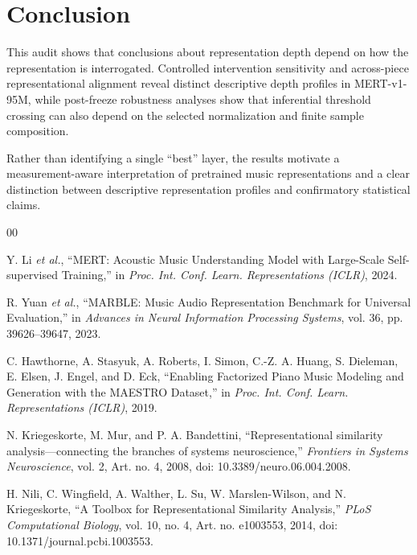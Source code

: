 \documentclass[conference]{IEEEtran}
\begin{document}
\section{Conclusion}

This audit shows that conclusions about representation depth depend on how the
representation is interrogated.
Controlled intervention sensitivity and across-piece representational
alignment reveal distinct descriptive depth profiles in MERT-v1-95M, while
post-freeze robustness analyses show that inferential threshold crossing can
also depend on the selected normalization and finite sample composition.

Rather than identifying a single ``best'' layer, the results motivate a
measurement-aware interpretation of pretrained music representations and a
clear distinction between descriptive representation profiles and
confirmatory statistical claims.

\balance
\begin{thebibliography}{00}

Y. Li \emph{et al.}, ``MERT: Acoustic Music Understanding Model with
Large-Scale Self-supervised Training,'' in \emph{Proc. Int. Conf. Learn.
Representations (ICLR)}, 2024.

R. Yuan \emph{et al.}, ``MARBLE: Music Audio Representation Benchmark for
Universal Evaluation,'' in \emph{Advances in Neural Information Processing
Systems}, vol. 36, pp. 39626--39647, 2023.

C. Hawthorne, A. Stasyuk, A. Roberts, I. Simon, C.-Z. A. Huang,
S. Dieleman, E. Elsen, J. Engel, and D. Eck,
``Enabling Factorized Piano Music Modeling and Generation with the MAESTRO
Dataset,'' in \emph{Proc. Int. Conf. Learn. Representations (ICLR)}, 2019.

N. Kriegeskorte, M. Mur, and P. A. Bandettini,
``Representational similarity analysis---connecting the branches of systems
neuroscience,'' \emph{Frontiers in Systems Neuroscience}, vol. 2, Art. no. 4,
2008, doi: 10.3389/neuro.06.004.2008.

H. Nili, C. Wingfield, A. Walther, L. Su, W. Marslen-Wilson, and
N. Kriegeskorte, ``A Toolbox for Representational Similarity Analysis,''
\emph{PLoS Computational Biology}, vol. 10, no. 4, Art. no. e1003553, 2014,
doi: 10.1371/journal.pcbi.1003553.

\end{thebibliography}
\end{document}
